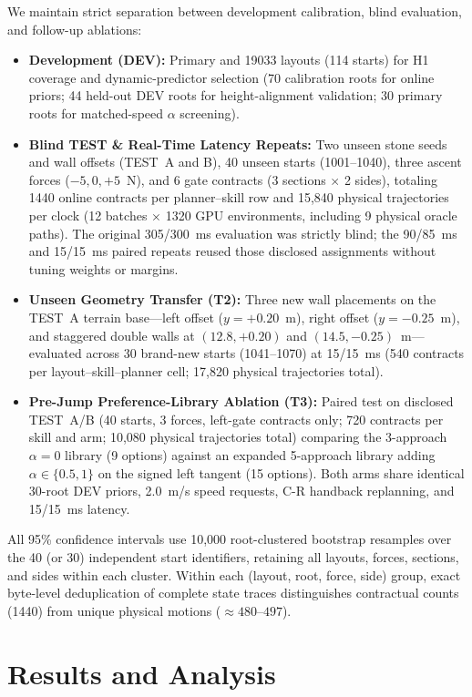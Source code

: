 \documentclass[letterpaper,10pt,conference]{ieeeconf}
\begin{document}
We maintain strict separation between development calibration, blind evaluation, and follow-up ablations:
\begin{itemize}
\item \textbf{Development (DEV):} Primary and 19033 layouts (114 starts) for H1 coverage and dynamic-predictor selection (70 calibration roots for online priors; 44 held-out DEV roots for height-alignment validation; 30 primary roots for matched-speed $\alpha$ screening).
\item \textbf{Blind TEST \& Real-Time Latency Repeats:} Two unseen stone seeds and wall offsets (TEST~A and B), 40 unseen starts (1001--1040), three ascent forces ($-5,0,+5$~N), and 6 gate contracts (3 sections $\times$ 2 sides), totaling 1440 online contracts per planner--skill row and 15,840 physical trajectories per clock (12 batches $\times$ 1320 GPU environments, including 9 physical oracle paths). The original 305/300~ms evaluation was strictly blind; the 90/85~ms and 15/15~ms paired repeats reused those disclosed assignments without tuning weights or margins.
\item \textbf{Unseen Geometry Transfer (T2):} Three new wall placements on the TEST~A terrain base---left offset ($y=+0.20$~m), right offset ($y=-0.25$~m), and staggered double walls at $(12.8,+0.20)$ and $(14.5,-0.25)$~m---evaluated across 30 brand-new starts (1041--1070) at 15/15~ms (540 contracts per layout--skill--planner cell; 17,820 physical trajectories total).
\item \textbf{Pre-Jump Preference-Library Ablation (T3):} Paired test on disclosed TEST~A/B (40 starts, 3 forces, left-gate contracts only; 720 contracts per skill and arm; 10,080 physical trajectories total) comparing the 3-approach $\alpha=0$ library (9 options) against an expanded 5-approach library adding $\alpha\in\{0.5,1\}$ on the signed left tangent (15 options). Both arms share identical 30-root DEV priors, 2.0~m/s speed requests, C-R handback replanning, and 15/15~ms latency.
\end{itemize}

All 95\% confidence intervals use 10,000 root-clustered bootstrap resamples over the 40 (or 30) independent start identifiers, retaining all layouts, forces, sections, and sides within each cluster. Within each (layout, root, force, side) group, exact byte-level deduplication of complete state traces distinguishes contractual counts (1440) from unique physical motions ($\approx 480$--$497$).

\section{Results and Analysis}
\end{document}
